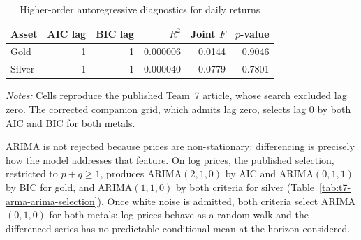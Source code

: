 \begin{table}[htbp]
\centering
\caption{Higher-order autoregressive diagnostics for daily returns}
\label{tab:t7-arp-diagnostics}
\small
\begin{tabular}{lrrrrr}
\toprule
Asset & AIC lag & BIC lag & $R^2$ & Joint $F$ & $p$-value \\
\midrule
Gold   & 1 & 1 & 0.000006 & 0.0144 & 0.9046 \\
Silver & 1 & 1 & 0.000040 & 0.0779 & 0.7801 \\
\bottomrule
\end{tabular}
\begin{minipage}{0.90\textwidth}
\footnotesize\emph{Notes:} Cells reproduce the published Team~7 article,
whose search excluded lag zero. The corrected companion grid, which admits
lag zero, selects lag 0 by both AIC and BIC for both metals.
\end{minipage}
\end{table}

ARIMA is not rejected because prices are non-stationary: differencing is
precisely how the model addresses that feature. On log prices, the published
selection, restricted to $p+q\geq 1$, produces ARIMA$(2,1,0)$ by AIC and
ARIMA$(0,1,1)$ by BIC for gold, and ARIMA$(1,1,0)$ by both criteria for
silver (Table~\ref{tab:t7-arma-arima-selection}). Once white noise is admitted, both criteria select ARIMA$(0,1,0)$ for
both metals: log prices behave as a random walk and the differenced series has
no predictable conditional mean at the horizon considered.


